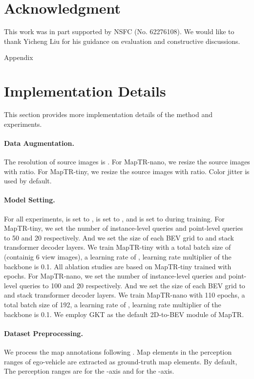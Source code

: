 \documentclass{article} \usepackage{iclr2023_conference,times}
\begin{document}
\section*{Acknowledgment}
This work was in part supported by NSFC (No. 62276108). We would like to thank Yicheng Liu for his guidance on evaluation and constructive discussions.







\newpage

\appendix
{\LARGE  Appendix}

\section{Implementation Details}
\label{sec:more_details}
This section provides more implementation details of the method and experiments.

\paragraph{Data Augmentation.}
The resolution of source images is . For MapTR-nano, we resize the source images with  ratio. For MapTR-tiny, we resize the source images with  ratio. Color jitter is used by default.


\paragraph{Model Setting.}
For all experiments,  is set to ,  is set to , and  is set to  during training. For MapTR-tiny, we set the number of instance-level queries and point-level queries to 50 and 20 respectively.
And  we set the size of each BEV grid to  and stack  transformer decoder layers. We train MapTR-tiny with a total batch size of  (containig 6 view images), a learning rate of , learning rate multiplier of the backbone is 0.1. All ablation studies are based on MapTR-tiny trained with  epochs.
For MapTR-nano, we set the number of instance-level queries and point-level queries to 100 and 20 respectively. And we set the size of each BEV grid to  and stack  transformer decoder layers. We train MapTR-nano with 110 epochs, a total batch size of 192, a learning rate of , learning rate multiplier of the backbone is 0.1. We employ GKT \citep{gkt} as the default 2D-to-BEV module  of MapTR.

\paragraph{Dataset Preprocessing.}
We process the map annotations following \cite{vectormapnet, hdmapnet}. Map elements in the perception ranges of ego-vehicle are extracted as ground-truth map elements. By default, The perception ranges are  for the -axis and  for the -axis.
\end{document}
